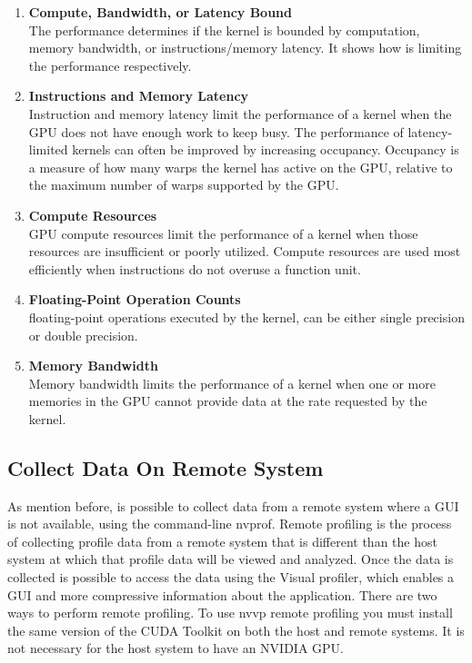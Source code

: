 \begin{enumerate}
  \item \textbf{Compute, Bandwidth, or Latency Bound} \hfill \\
      The performance determines if the kernel is bounded by computation, memory bandwidth, or instructions/memory latency. It shows how is limiting the performance respectively.
  
  \item \textbf{Instructions and Memory Latency} \hfill \\
Instruction and memory latency limit the performance of a kernel when the GPU does not have enough work to keep busy. The performance of latency-limited kernels can often be improved by increasing occupancy. Occupancy is a measure of how many warps the kernel has active on the GPU, relative to the maximum number of warps supported by the GPU.
  
  \item \textbf{Compute Resources} \hfill \\
GPU compute resources limit the performance of a kernel when those resources are insufficient or poorly utilized. Compute resources are used most efficiently when instructions do not overuse a function unit. 
  \item \textbf{Floating-Point Operation Counts} \hfill \\
  floating-point operations executed by the kernel, can be either single precision or double precision.
  
  \item \textbf{Memory Bandwidth} \hfill \\
  Memory bandwidth limits the performance of a kernel when one or more memories in the GPU cannot provide data at the rate requested by the kernel.
\end{enumerate}

\subsection{Collect Data On Remote System}

As mention before, is possible to collect data from a remote system where a GUI is not available, using the command-line nvprof. Remote profiling is the process of collecting profile data from a remote system that is different than the host system at which that profile data will be viewed and analyzed. Once the data is collected is possible to access the data using the Visual profiler, which enables a GUI and more compressive information about the application. There are two ways to perform remote profiling. To use nvvp remote profiling you must install the same version of the CUDA Toolkit on both the host and remote systems. It is not necessary for the host system to have an NVIDIA GPU. \cite{tool}


